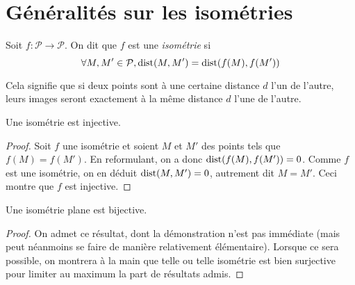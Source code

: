 


\section{Généralités sur les isométries}

\begin{definition}
Soit $f : \mathcal P \to \mathcal P$. On dit que $f$ est une \emph{isométrie} si
\[ \forall M, M' \in \mathcal P, \operatorname{dist}(M,M') = \operatorname{dist}(f(M),f(M'))\]
\end{definition}

Cela signifie que si deux points sont à une certaine distance $d$ l'un de l'autre, leurs images seront exactement à la même distance $d$ l'une de l'autre.



\begin{proposition}
Une isométrie  est injective.
\end{proposition}
\begin{proof}
Soit $f$ une isométrie et soient $M$ et $M'$ des points tels que $f(M)=f(M')$. En reformulant, on a donc $\operatorname{dist}(f(M), f(M'))=0$. Comme $f$ est une isométrie, on en déduit $\operatorname{dist}(M,M')=0$, autrement dit $M=M'$. Ceci montre que $f$ est injective.
\end{proof}




\begin{proposition}
Une isométrie plane est bijective.
\end{proposition}
\begin{proof}
On admet ce résultat, dont la démonstration n'est pas immédiate (mais peut néanmoins se faire de manière relativement élémentaire). Lorsque ce sera possible, on montrera à la main que telle ou telle isométrie est bien surjective pour limiter au maximum la part de résultats admis.
\end{proof}

